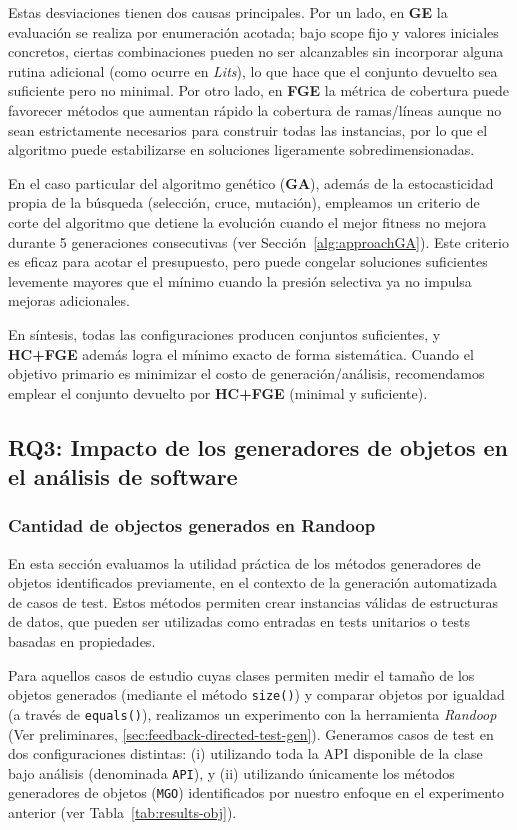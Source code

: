 Estas desviaciones tienen dos causas principales. Por un lado, en \textbf{GE} la
evaluación se realiza por enumeración acotada; bajo scope fijo y valores
iniciales concretos, ciertas combinaciones pueden no ser alcanzables sin
incorporar alguna rutina adicional (como ocurre en \emph{Lits}), lo que hace que
el conjunto devuelto sea suficiente pero no minimal. Por otro lado, en
\textbf{FGE} la métrica de cobertura puede favorecer métodos que
aumentan rápido la cobertura de ramas/líneas aunque no sean estrictamente
necesarios para construir todas las instancias, por lo que el algoritmo puede estabilizarse en soluciones
ligeramente sobredimensionadas.

En el caso particular del algoritmo genético (\textbf{GA}), además de la
estocasticidad propia de la búsqueda (selección, cruce, mutación), empleamos un
criterio de corte del algoritmo que detiene la evolución cuando el mejor
fitness no mejora durante 5 generaciones consecutivas (ver
Sección~\ref{alg:approachGA}). Este criterio es eficaz para acotar el presupuesto,
pero puede congelar soluciones suficientes levemente mayores que el
mínimo cuando la presión selectiva ya no impulsa mejoras adicionales.

En síntesis, todas las configuraciones producen conjuntos suficientes, y
\textbf{HC+FGE} además logra el mínimo exacto de forma sistemática. Cuando
el objetivo primario es minimizar el costo de generación/análisis, recomendamos
emplear el conjunto devuelto por \textbf{HC+FGE} (minimal y suficiente).



\subsection{RQ3: Impacto de los generadores de objetos en el análisis de
software}

\subsubsection{Cantidad de objectos generados en Randoop}

En esta sección evaluamos la utilidad práctica de los métodos generadores de objetos 
identificados previamente, en el contexto de la generación automatizada de casos de test. 
Estos métodos permiten crear instancias válidas de estructuras de datos, que pueden ser utilizadas como 
entradas en tests unitarios o tests basadas en propiedades.

Para aquellos casos de estudio cuyas clases permiten medir el tamaño de los objetos generados 
(mediante el método \texttt{size()}) y comparar objetos por igualdad (a través de \texttt{equals()}), 
realizamos un experimento con la herramienta \emph{Randoop} (Ver preliminares, \ref{sec:feedback-directed-test-gen}). Generamos casos de test en dos 
configuraciones distintas: (i) utilizando toda la API disponible de la clase bajo análisis 
(denominada \texttt{API}), y (ii) utilizando únicamente los métodos generadores de objetos
(\texttt{MGO}) identificados por nuestro enfoque en el experimento anterior 
(ver Tabla~\ref{tab:results-obj}).

